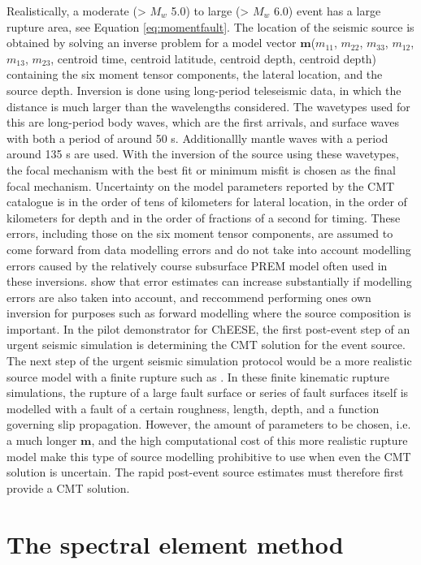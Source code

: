 \documentclass[../Text/00main.tex]{subfiles}
\begin{document}
Realistically, a moderate (> $M_w$ 5.0) to large (> $M_w$ 6.0) event has a large rupture area, see Equation \ref{eq:momentfault}. The location of the seismic source is obtained by solving an inverse problem for a model vector $\mathbf{m}$($m_{11}$, $m_{22}$, $m_{33}$, $m_{12}$, $m_{13}$, $m_{23}$, centroid time, centroid latitude, centroid depth, centroid depth) containing the six moment tensor components, the lateral location, and the source depth. Inversion is done using long-period teleseismic data, in which the distance is much larger than the wavelengths considered. The wavetypes used for this are long-period body waves, which are the first arrivals, and surface waves with both a period of around 50 s. Additionallly mantle waves with a period around 135 s are used. With the inversion of the source using these wavetypes, the focal mechanism with the best fit or minimum misfit is chosen as the final focal mechanism. Uncertainty on the model parameters reported by the CMT catalogue is in the order of tens of kilometers for lateral location, in the order of kilometers for depth and in the order of fractions of a second for timing. These errors, including those on the six moment tensor components, are assumed to come forward from data modelling errors and do not take into account modelling errors caused by the relatively course subsurface PREM model often used in these inversions. \citep{valentine_assessing_2012} show that error estimates can increase substantially if modelling errors are also taken into account, and reccommend performing ones own inversion for purposes such as forward modelling where the source composition is important. In the pilot demonstrator for ChEESE, the first post-event step of an urgent seismic simulation is determining the CMT solution for the event source. The next step of the urgent seismic simulation protocol would be a more realistic source model with a finite rupture such as \citet{graves_kinematic_2016}. In these finite kinematic rupture simulations, the rupture of a large fault surface or series of fault surfaces itself is modelled with a fault of a certain roughness, length, depth, and a function governing slip propagation. However, the amount of parameters to be chosen, i.e. a much longer $\mathbf{m}$, and the high computational cost of this more realistic rupture model make this type of source modelling prohibitive to use when even the CMT solution is uncertain. The rapid post-event source estimates must therefore first provide a CMT solution.


\section{The spectral element method}
\end{document}
